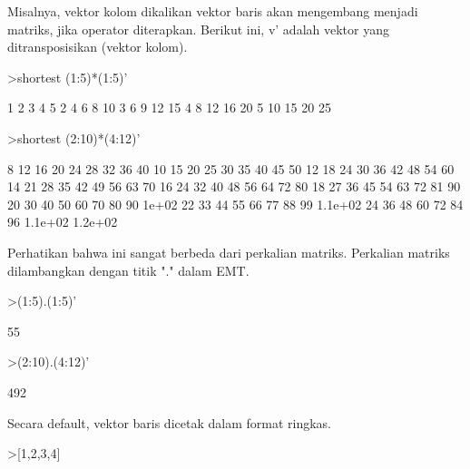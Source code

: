 \documentclass[a4paper,10pt]{article}
\begin{document}
\begin{eulernotebook}
\begin{eulercomment}
\begin{eulercomment}
\begin{eulercomment}
\begin{eulercomment}
\begin{eulercomment}
\begin{eulercomment}
\begin{eulercomment}
Misalnya, vektor kolom dikalikan vektor baris akan mengembang menjadi
matriks, jika operator diterapkan. Berikut ini, v' adalah vektor yang
ditransposisikan (vektor kolom).
\end{eulercomment}
\begin{eulerprompt}
>shortest (1:5)*(1:5)'
\end{eulerprompt}
\begin{euleroutput}
       1      2      3      4      5 
       2      4      6      8     10 
       3      6      9     12     15 
       4      8     12     16     20 
       5     10     15     20     25 
\end{euleroutput}
\begin{eulerprompt}
>shortest (2:10)*(4:12)'
\end{eulerprompt}
\begin{euleroutput}
       8     12     16     20     24     28     32     36     40 
      10     15     20     25     30     35     40     45     50 
      12     18     24     30     36     42     48     54     60 
      14     21     28     35     42     49     56     63     70 
      16     24     32     40     48     56     64     72     80 
      18     27     36     45     54     63     72     81     90 
      20     30     40     50     60     70     80     90  1e+02 
      22     33     44     55     66     77     88     99 1.1e+02 
      24     36     48     60     72     84     96 1.1e+02 1.2e+02 
\end{euleroutput}
\begin{eulercomment}
Perhatikan bahwa ini sangat berbeda dari perkalian matriks. Perkalian
matriks dilambangkan dengan titik "." dalam EMT.
\end{eulercomment}
\begin{eulerprompt}
>(1:5).(1:5)'
\end{eulerprompt}
\begin{euleroutput}
  55
\end{euleroutput}
\begin{eulerprompt}
>(2:10).(4:12)'
\end{eulerprompt}
\begin{euleroutput}
  492
\end{euleroutput}
\begin{eulercomment}
Secara default, vektor baris dicetak dalam format ringkas.
\end{eulercomment}
\begin{eulerprompt}
>[1,2,3,4]
\end{eulerprompt}
\begin{euleroutput}

\end{euleroutput}
\end{eulercomment}
\end{eulercomment}
\end{eulercomment}
\end{eulercomment}
\end{eulercomment}
\end{eulercomment}
\end{eulernotebook}
\end{document}
